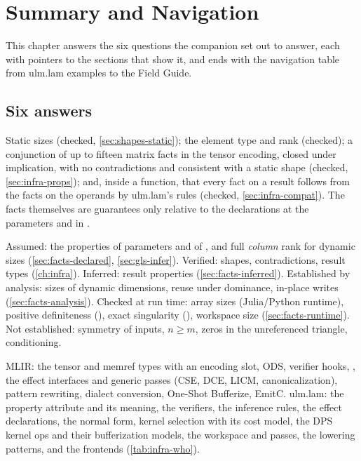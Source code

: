 \chapter{Summary and Navigation}
\label{ch:summary}

This chapter answers the six questions the companion set out to answer,
each with pointers to the sections that show it, and ends with the
navigation table from ulm.lam examples to the Field Guide.

\section{Six answers}
\label{sec:summary-answers}

 Static sizes
(checked, \cref{sec:shapes-static}); the element type and rank (checked);
a conjunction of up to fifteen matrix facts in the tensor encoding, closed
under implication, with no contradictions and consistent with a static
shape (checked, \cref{sec:infra-props}); and, inside a function, that every
fact on a result follows from the facts on the operands by ulm.lam's rules
(checked, \cref{sec:infra-compat}). The facts themselves are guarantees
only relative to the declarations at the parameters and in .

 Assumed: the properties of parameters and of , and full
\emph{column} rank for dynamic sizes (\cref{sec:facts-declared},
\cref{sec:gls-infer}). Verified: shapes, contradictions, result types
(\cref{ch:infra}). Inferred: result properties (\cref{sec:facts-inferred}).
Established by analysis: sizes of dynamic dimensions, reuse under
dominance, in-place writes (\cref{sec:facts-analysis}). Checked at run
time: array sizes (Julia/Python runtime), positive definiteness
(), exact singularity (), workspace size
(\cref{sec:facts-runtime}). Not established: symmetry of inputs, \(n\ge m\),
zeros in the unreferenced triangle, conditioning.

MLIR: the tensor and memref types with an encoding slot, ODS, verifier
hooks, , the effect interfaces and generic passes
(CSE, DCE, LICM, canonicalization), pattern rewriting, dialect conversion,
One-Shot Bufferize, EmitC. ulm.lam: the property attribute and its meaning,
the verifiers, the inference rules, the effect declarations, the normal
form, kernel selection with its cost model, the DPS kernel ops and their
bufferization models, the workspace and  passes, the lowering
patterns, and the frontends (\cref{tab:infra-who}).

